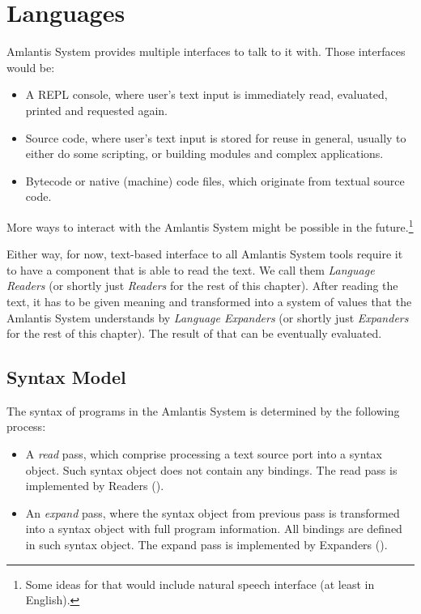 
\chapter{Languages}
\label{ch:environment-languages}

Amlantis System provides multiple interfaces to talk to it with. Those interfaces would be:

\begin{itemize}
  \item A REPL console, where user's text input is immediately read, evaluated, printed and requested again.
  \item Source code, where user's text input is stored for reuse in general, usually to either do some scripting, or building modules and complex applications. 
  \item Bytecode or native (machine) code files, which originate from textual source code.
\end{itemize}

More ways to interact with the Amlantis System might be possible in the future.\footnote{Some ideas for that would include natural speech interface (at least in English).}

Either way, for now, text-based interface to all Amlantis System tools require it to have a component that is able to read the text. We call them {\em Language Readers} (or shortly just {\em Readers} for the rest of this chapter). After reading the text, it has to be given meaning and transformed into a system of values that the Amlantis System understands by {\em Language Expanders} (or shortly just {\em Expanders} for the rest of this chapter). The result of that can be eventually evaluated.





\section{Syntax Model}
\label{sec:environment-language-syntax-model}

The syntax of programs in the Amlantis System is determined by the following process: 

\begin{itemize}
  \item \label{itm:environment-language-read-pass} A {\em read} pass, which comprise processing a text source port into a syntax object. Such syntax object does not contain any bindings. The read pass is implemented by Readers ().
  \item \label{itm:environment-language-expand-pass} An {\em expand} pass, where the syntax object from previous pass is transformed into a syntax object with full program information. All bindings are defined in such syntax object. The expand pass is implemented by Expanders ().

\end{itemize}

